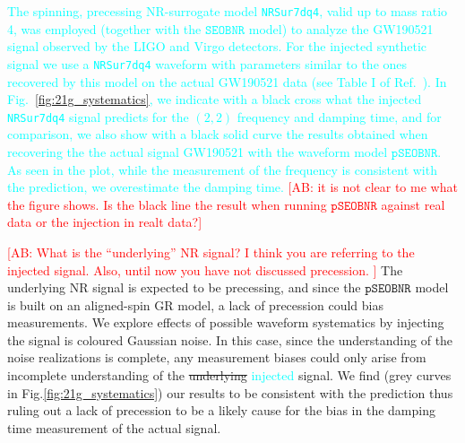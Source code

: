 \documentclass[twocolumn,prd,aps,superscriptaddress,preprintnumbers,tightenlines,showpacs,nofootinbib,eqsecnum,amsfonts,amsmath]{revtex4-1}
\newcommand{\ab}[1]{\textcolor{cyan}{#1}}
\newcommand{\comment}[1]{\textcolor{red}{[#1]}}
\newcommand{\pSEOB}{\texttt{pSEOBNR}}
\newcommand{\SEOB}{\texttt{SEOBNR}}
\begin{document}
\ab{The spinning, precessing NR-surrogate model \texttt{NRSur7dq4}, valid up to mass ratio 4, was employed 
(together with the $\SEOB$ model) to analyze the GW190521 signal observed by the LIGO and Virgo detectors. 
For the injected synthetic signal we use a \texttt{NRSur7dq4} waveform with parameters similar to the ones 
recovered by this model on the actual GW190521 data (see Table I of Ref.~\cite{Abbott:2020tfl}).}  
\ab{In Fig.~\ref{fig:21g_systematics}, we indicate with a black cross what the injected \texttt{NRSur7dq4} signal 
predicts for the $(2,2)$ frequency and damping time, and for comparison, we also 
show with a black solid curve the results obtained when recovering the the actual signal GW190521 with the waveform model $\pSEOB$. As seen in the plot, while 
the measurement of the frequency is consistent with the prediction, we overestimate the damping time.} \comment{AB: it is not clear 
to me what the figure shows. Is the black line the result when running $\pSEOB$ against real data or the 
injection in realt data?}

\comment{AB: What is the ``underlying'' NR signal? I think you are referring to the 
injected signal. Also, until now you have not discussed precession. 
} The underlying NR signal is expected to be precessing, and since the
$\pSEOB$ model is built on an aligned-spin GR model, a lack of
precession could bias measurements. We explore effects of possible
waveform systematics by injecting the signal is coloured Gaussian
noise. In this case, since the understanding of the noise realizations
is complete, any measurement biases could only arise from incomplete
understanding of the \sout{underlying} \ab{injected} signal. We find (grey curves in
Fig.\ref{fig:21g_systematics}) our results to be consistent with the
prediction thus ruling out a lack of precession to be a likely cause
for the bias in the damping time measurement of the actual signal.
\end{document}
